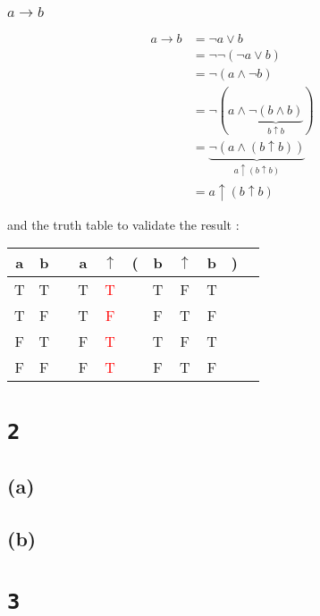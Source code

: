 \documentclass[a4paper,11pt]{report}
\begin{document}
\subsubsection*{$a \rightarrow b$}

\begin{align*}
  a \rightarrow b &= \neg a \vee b\\
                  &= \neg \neg (\neg a \vee b)\\
                  &= \neg (a \wedge \neg b)\\
                  &= \neg (a \wedge \underbrace{\neg (b \wedge b)}_{b \uparrow b})\\
                  &= \underbrace{\neg (a \wedge (b \uparrow b))}_{a \uparrow (b \uparrow b)}\\
                  &= a \uparrow (b \uparrow b)
\end{align*}

and the truth table to validate the result :

\begin{center}
  \begin{tabular}{@{ }c@{ }@{ }c | c@{ }@{ }c@{ }@{ }c@{ }@{}c@{}@{ }c@{ }@{ }c@{ }@{ }c@{ }@{}c@{}@{ }c}
    a & b &  & a & $\uparrow$ & ( & b & $\uparrow$ & b & ) & \\
    \hline 
    T & T &  & T & \textcolor{red}{T} &  & T & F & T &  & \\
    T & F &  & T & \textcolor{red}{F} &  & F & T & F &  & \\
    F & T &  & F & \textcolor{red}{T} &  & T & F & T &  & \\
    F & F &  & F & \textcolor{red}{T} &  & F & T & F &  & \\
  \end{tabular}
\end{center}

\section*{\texttt{2}}

\subsection*{(a)}

\subsection*{(b)}

\section*{\texttt{3}}
\end{document}
